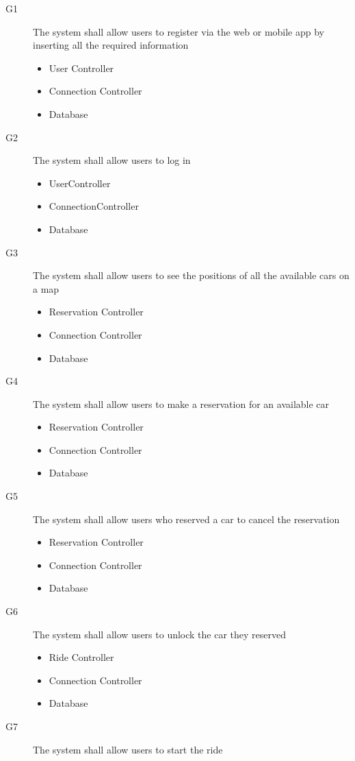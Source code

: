 \documentclass{article}
\begin{document}
\begin{flushleft}
\begin{description}
\item [G1] The system shall allow users to register via the web or mobile app by inserting all the required information
\begin{itemize}
\item User Controller
\item Connection Controller
\item Database
\end{itemize}
\item [G2] The system shall allow users to log in
\begin{itemize}
\item UserController
\item ConnectionController
\item Database
\end{itemize}
\item [G3] The system shall allow users to see the positions of all the available cars on a map
\begin{itemize}
\item Reservation Controller
\item Connection Controller
\item Database
\end{itemize}
\item [G4] The system shall allow users to make a reservation for an available car
\begin{itemize}
\item Reservation Controller
\item Connection Controller
\item Database
\end{itemize}
\item [G5] The system shall allow users who reserved a car to cancel the reservation
\begin{itemize}
\item Reservation Controller
\item Connection Controller
\item Database
\end{itemize}
\item [G6] The system shall allow users to unlock the car they reserved
\begin{itemize}
\item Ride Controller
\item Connection Controller
\item Database
\end{itemize}
\item [G7] The system shall allow users to start the ride

\end{description}
\end{flushleft}
\end{document}
